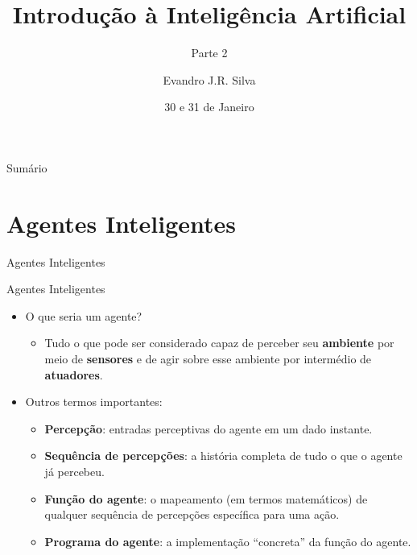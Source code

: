 \documentclass{libs/ufc_format}
\title[Introdução a IA]{\huge\textbf{Introdução à Inteligência Artificial}}
\subtitle{Parte 2}
\author{Evandro J.R. Silva}
\institute[Estácio Teresina]{
    \normalsize{\email{ejrs.profissional@gmail.com}}
    \newline
    \newline
    \estaciothe
}
\date{30 e 31 de Janeiro}
\begin{document}


\begin{frame}{}
    \maketitle
\end{frame}

\begin{frame}{Sumário}
    \begin{multicols}{2}
        \tableofcontents
    \end{multicols}
\end{frame}

\section{Agentes Inteligentes}

\begin{frame}{}
    \centering
    \Large
    Agentes Inteligentes
\end{frame}

\begin{frame}{Agentes Inteligentes}
    \begin{itemize}
        \justifying
        \item O que seria um agente?
            \begin{itemize}
                \justifying
                \item Tudo o que pode ser considerado capaz de perceber seu \textbf{ambiente} por meio de \textbf{sensores} e de agir sobre esse ambiente por intermédio de \textbf{atuadores}.
            \end{itemize}
        \item<2-> Outros termos importantes:
            \begin{itemize}
                \justifying
                \item<2-> \textbf{Percepção}: entradas perceptivas do agente em um dado instante.
                \item<3-> \textbf{Sequência de percepções}: a história completa de tudo o que o agente já percebeu.
                \item<4-> \textbf{Função do agente}: o mapeamento (em termos matemáticos) de qualquer sequência de percepções específica para uma ação.
                \item<5> \textbf{Programa do agente}: a implementação ``concreta'' da função do agente.
            \end{itemize}
    \end{itemize}
\end{frame}
\end{document}
